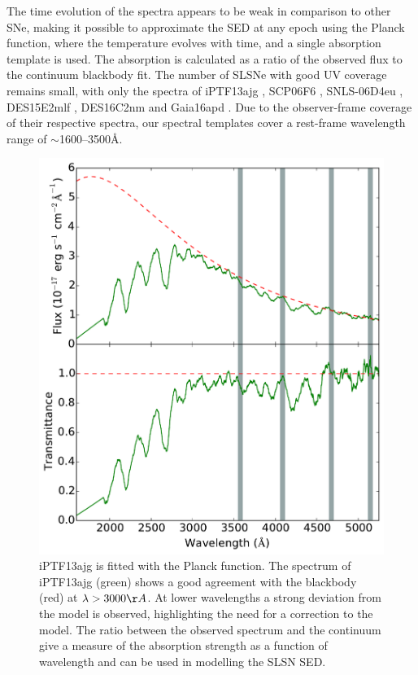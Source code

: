 The time evolution of the spectra appears to be weak in comparison to other SNe, making it possible to approximate the SED at any epoch using the Planck function, where the temperature evolves with time, and a single absorption template is used. The absorption is calculated as a ratio of the observed flux to the continuum blackbody fit. The number of SLSNe with good UV coverage remains small, with only the spectra of iPTF13ajg \citep{Vreeswijk2014}, SCP06F6 \citep{Barbary2009}, SNLS-06D4eu \citep{Howell2013}, DES15E2mlf \citep{Pan2017}, DES16C2nm \citep{Smith2018} and Gaia16apd \citep{Yan2017}. Due to the observer-frame coverage of their respective spectra, our spectral templates cover a rest-frame wavelength range of $\sim$1600--3500\AA.

\begin{figure}
\centering
\includegraphics[width=\textwidth]{Figures/Chapter3/specTemplate}
\caption{iPTF13ajg is fitted with the Planck function. The spectrum of iPTF13ajg (green) shows a good agreement with the blackbody (red) at $\lambda>3000\AA$. At lower wavelengths a strong deviation from the model is observed, highlighting the need for a correction to the model. The ratio between the observed spectrum and the continuum give a measure of the absorption strength as a function of wavelength and can be used in modelling the SLSN SED.}
\label{fig:specTemplate}
\end{figure}


